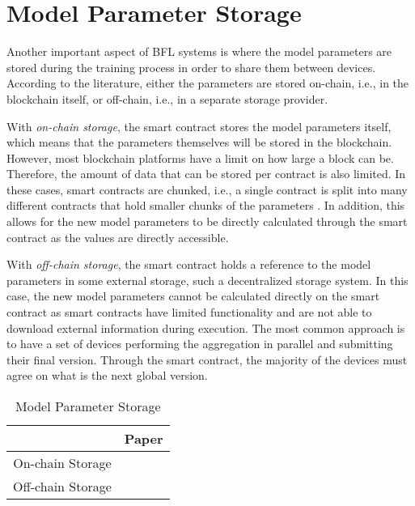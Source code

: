 \section{Model Parameter Storage}

Another important aspect of BFL systems is where the model parameters are stored during the training process in order to share them between devices. According to the literature, either the parameters are stored on-chain, i.e., in the blockchain itself, or off-chain, i.e., in a separate storage provider.

With \textit{on-chain storage}, the smart contract stores the model parameters itself, which means that the parameters themselves will be stored in the blockchain. However, most blockchain platforms have a limit on how large a block can be. Therefore, the amount of data that can be stored per contract is also limited. In these cases, smart contracts are chunked, i.e., a single contract is split into many different contracts that hold smaller chunks of the parameters \cite{9274451, baffle}. In addition, this allows for the new model parameters to be directly calculated through the smart contract as the values are directly accessible.
    
With \textit{off-chain storage}, the smart contract holds a reference to the model parameters in some external storage, such a decentralized storage system. In this case, the new model parameters cannot be calculated directly on the smart contract as smart contracts have limited functionality and are not able to download external information during execution. The most common approach is to have a set of devices performing the aggregation in parallel and submitting their final version. Through the smart contract, the majority of the devices must agree on what is the next global version.

\begin{table}[!b]
\begin{tabular}{c|c} \hline \hline
                  & Paper \\ \hline \hline
On-chain Storage  & \cite{9274451, baffle, demo, 8733825, 9524833, 8894364, 9184854, 8893114}\\ \hline
Off-chain Storage & \cite{10.1145/3319535.3363256, 10.48550/arxiv.2011.07516, 8945913, 10.48550/arxiv.2202.02817, 10.48550/arxiv.2007.03856, 10.48550/arxiv.1910.12603, Peyvandi2022, 9170559} \\      \hline
\end{tabular}
\caption{Model Parameter Storage}\label{tab:storage}
\end{table}

